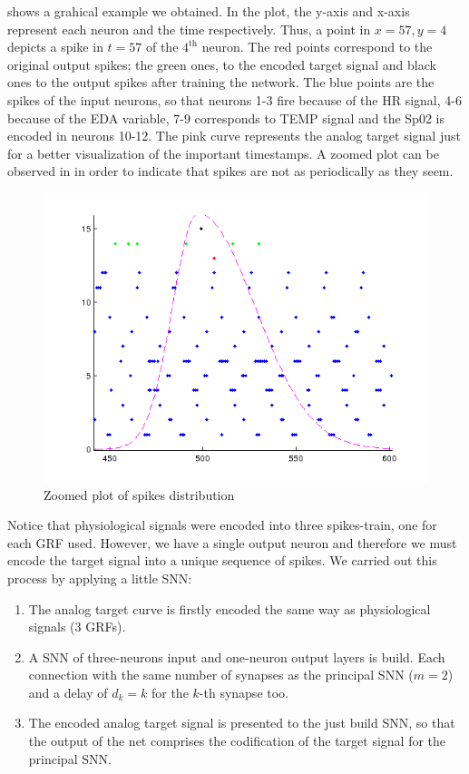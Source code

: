  shows a grahical example we obtained. In the plot, the y-axis and x-axis represent each neuron and the time respectively. Thus, a point in $x=57, y=4$ depicts a spike in $t=57$ of the $4^{\text{th}}$ neuron. The red points correspond to the original output spikes; the green ones, to the encoded target signal and black ones to the output spikes after training the network. The blue points are the spikes of the input neurons, so that neurons 1-3 fire because of the HR signal, 4-6 because of the EDA variable, 7-9 corresponds to TEMP signal and the Sp02 is encoded in neurons 10-12. The pink curve represents the analog target signal just for a better visualization of the important timestamps. A zoomed plot can be observed in  in order to indicate that spikes are not as periodically as they seem.
\begin{figure}[!ht]
\centering
\includegraphics[width=0.85\columnwidth]{images/results/snn1zoomed.png}
\caption{Zoomed plot of spikes distribution}
\label{fig:snnResultsZoom}
\end{figure}

Notice that physiological signals were encoded into three spikes-train, one for each GRF used. However, we have a single output neuron and therefore we must encode the target signal into a unique sequence of spikes. We carried out this process by applying a little SNN: 
\begin{enumerate}
\item The analog target curve is firstly encoded the same way as physiological signals (3 GRFs).
\item A SNN of three-neurons input and one-neuron output layers is build. Each connection with the same number of synapses as the principal SNN ($m=2$) and a delay of $d_{k}=k$ for the $k$-th synapse too.
\item The encoded analog target signal is presented to the just build SNN, so that the output of the net comprises the codification of the target signal for the principal SNN.
\end{enumerate}


